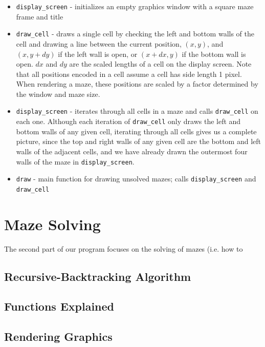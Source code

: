 \documentclass[11pt, margin=1in]{article}
\begin{document}
\begin{itemize}
\item \texttt{display\_screen} - initializes an empty graphics window with a square maze frame and title
\item \texttt{draw\_cell} - draws a single cell by checking the left and bottom walls of the cell and drawing a line between the current position, $(x, y)$, and $(x, y + dy)$ if the left wall is open, or $(x + dx, y)$ if the bottom wall is open. $dx$ and $dy$ are the scaled lengths of a cell on the display screen. Note that all positions encoded in a cell assume a cell has side length 1 pixel. When rendering a maze, these positions are scaled by a factor determined by the window and maze size.
\item \texttt{display\_screen} - iterates through all cells in a maze and calls \texttt{draw\_cell} on each one. Although each iteration of \texttt{draw\_cell} only draws the left and bottom walls of any given cell, iterating through all cells gives us a complete picture, since the top and right walls of any given cell are the bottom and left walls of the adjacent cells, and we have already drawn the outermost four walls of the maze in \texttt{display\_screen}. 
\item \texttt{draw} - main function for drawing unsolved mazes; calls \texttt{display\_screen} and \texttt{draw\_cell}
\end{itemize} 

\section{Maze Solving} 
The second part of our program focuses on the solving of mazes (i.e. how to 

\subsection{Recursive-Backtracking Algorithm} %

\subsection{Functions Explained} %

\subsection{Rendering Graphics} %
\end{document}
